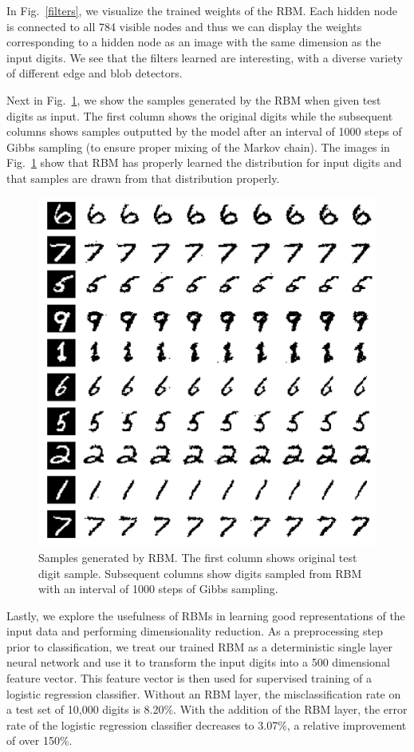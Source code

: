 \documentclass[journal]{IEEEtran}
\begin{document}
In Fig.~\ref{filters}, we visualize the trained weights of the RBM. Each hidden node is connected to all 784 visible nodes and thus we can display the weights corresponding to a hidden node as an image with the same dimension as the input digits. We see that the filters learned are interesting, with a diverse variety of different edge and blob detectors. 

Next in Fig.~\ref{samples}, we show the samples generated by the RBM when given test digits as input. The first column shows the original digits while the subsequent columns shows samples outputted by the model after an interval of 1000 steps of Gibbs sampling (to ensure proper mixing of the Markov chain). The images in Fig.~\ref{samples} show that RBM has properly learned the distribution for input digits and that samples are drawn from that distribution properly. 

\begin{figure}[h]
  \centering
  \includegraphics[width=0.9\linewidth]{samples.png}
  \caption{Samples generated by RBM. The first column shows original test digit sample. Subsequent columns show digits sampled from RBM with an interval of 1000 steps of Gibbs sampling.}
  \label{samples}
\end{figure}

Lastly, we explore the usefulness of RBMs in learning good representations of the input data and performing dimensionality reduction. As a preprocessing step prior to classification, we treat our trained RBM as a deterministic single layer neural network and use it to transform the input digits into a 500 dimensional feature vector. This feature vector is then used for supervised training of a logistic regression classifier. Without an RBM layer, the misclassification rate on a test set of 10,000 digits is 8.20\%. With the addition of the RBM layer, the error rate of the logistic regression classifier decreases to 3.07\%, a relative improvement of over 150\%. 
\end{document}
